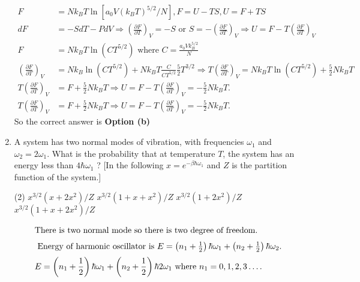 \begin{enumerate}
\begin{tasks}
\end{tasks}	
\begin{answer}
	\begin{align*}
    F&=N k_{B} T \ln \left[a_{0} V\left(k_{B} T\right)^{5 / 2} / N\right], F=U-T S, U=F+T S\\
	d F&=-S d T-P d V \Rightarrow\left(\frac{\partial F}{\partial T}\right)_{V}=-S \text { or } S=-\left(\frac{\partial F}{\partial T}\right)_{V} \Rightarrow U=F-T\left(\frac{\partial F}{\partial T}\right)_{V} \\
	F&=N k_{B} T \ln \left(C T^{5 / 2}\right) \text { where } C=\frac{a_{0} V k_{B}^{5 / 2}}{N} \\
	\left(\frac{\partial F}{\partial T}\right)_{V}&=N k_{B} \ln \left(C T^{5 / 2}\right)+N k_{B} T \frac{C}{C T^{5 / 2}} \frac{5}{2} T^{3 / 2} \Rightarrow T\left(\frac{\partial F}{\partial T}\right)_{V}=N k_{B} T \ln \left(C T^{5 / 2}\right)+\frac{5}{2} N k_{B} T \\
	T\left(\frac{\partial F}{\partial T}\right)_{V}&=F+\frac{5}{2} N k_{B} T \Rightarrow U=F-T\left(\frac{\partial F}{\partial T}\right)_{V}=-\frac{5}{2} N k_{B} T .\\
	T\left(\frac{\partial F}{\partial T}\right)_{V}&=F+\frac{5}{2} N k_{B} T \Rightarrow U=F-T\left(\frac{\partial F}{\partial T}\right)_{V}=-\frac{5}{2} N k_{B} T .
	\end{align*}
	So the correct answer is \textbf{Option (b)}
\end{answer}
	\item A system has two normal modes of vibration, with frequencies $\omega_{1}$ and $\omega_{2}=2 \omega_{1}$. What is the probability that at temperature $T$, the system has an energy less than $4 \hbar \omega_{1}$ ?
	[In the following $x=e^{-\beta \hbar \omega_{1}}$ and $Z$ is the partition function of the system.]
	{	}
	 \begin{tasks}(2)
		\task[\textbf{a.}]$x^{3 / 2}\left(x+2 x^{2}\right) / Z$
		\task[\textbf{b.}]$x^{3 / 2}\left(1+x+x^{2}\right) / Z$
		\task[\textbf{c.}]$x^{3 / 2}\left(1+2 x^{2}\right) / Z$
		\task[\textbf{d.}] $x^{3 / 2}\left(1+x+2 x^{2}\right) / Z$
	\end{tasks}
\begin{answer}
	\begin{align*}
	 \intertext{There is two normal mode so there is two degree of freedom.}
\intertext{	Energy of harmonic oscillator is $E=\left(n_{1}+\frac{1}{2}\right) \hbar \omega_{1}+\left(n_{2}+\frac{1}{2}\right) \hbar \omega_{2}$.} E&=\left(n_{1}+\frac{1}{2}\right) \hbar \omega_{1}+\left(n_{2}+\frac{1}{2}\right) \hbar 2 \omega_{1}\text{ where } n_{1}=0,1,2,3 \ldots .

\end{align*}
\end{answer}
\end{enumerate}

